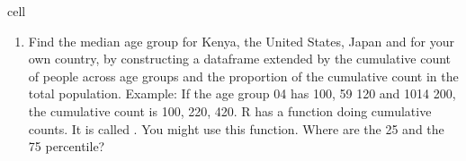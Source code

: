 \documentclass[letterpaper,10pt,english]{jupyterBook}
\begin{document}
\begin{sphinxuseclass}{cell}
\end{sphinxuseclass}\begin{enumerate}
%
\item {} 
\sphinxAtStartPar
Find the median age group for Kenya, the United States,
Japan and for your
own country, by constructing a dataframe extended by the cumulative count of
people across age groups and the proportion of the cumulative count
in the total population. Example: If the age group 0\sphinxhyphen{}4 has 100,
5\sphinxhyphen{}9 120 and 10\sphinxhyphen{}14 200, the cumulative count is 100, 220, 420. R has a function doing
cumulative counts. It is called . You might use this function.
Where are the 25 and the 75 percentile?

\end{enumerate}
\end{document}
